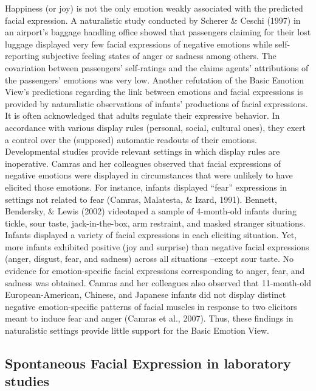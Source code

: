 \documentclass[man]{apa6}
\begin{document}
Happiness (or joy) is not the only emotion weakly associated with the predicted facial expression. A naturalistic study conducted by Scherer \& Ceschi (1997) in an airport's baggage handling office showed that passengers claiming for their lost luggage displayed very few facial expressions of negative emotions while self-reporting subjective feeling states of anger or sadness among others. The covariation between passengers' self-ratings and the claims agents' attributions of the passengers' emotions was very low. Another refutation of the Basic Emotion View's predictions regarding the link between emotions and facial expressions is provided by naturalistic observations of infants' productions of facial expressions. It is often acknowledged that adults regulate their expressive behavior. In accordance with various display rules (personal, social, cultural ones), they exert a control over the (supposed) automatic readouts of their emotions. Developmental studies provide relevant settings in which display rules are inoperative. Camras and her colleagues observed that facial expressions of negative emotions were displayed in circumstances that were unlikely to have elicited those emotions. For instance, infants displayed \enquote{fear} expressions in settings not related to fear (Camras, Malatesta, \& Izard, 1991). Bennett, Bendersky, \& Lewis (2002) videotaped a sample of 4-month-old infants during tickle, sour taste, jack-in-the-box, arm restraint, and masked stranger situations. Infants displayed a variety of facial expressions in each eliciting situation. Yet, more infants exhibited positive (joy and surprise) than negative facial expressions (anger, disgust, fear, and sadness) across all situations --except sour taste. No evidence for emotion-specific facial expressions corresponding to anger, fear, and sadness was obtained. Camras and her colleagues also observed that 11-month-old European-American, Chinese, and Japanese infants did not display distinct negative emotion-specific patterns of facial muscles in response to two elicitors meant to induce fear and anger (Camras et al., 2007). Thus, these findings in naturalistic settings provide little support for the Basic Emotion View.

\hypertarget{spontaneous-facial-expression-in-laboratory-studies}{%
\subsection{Spontaneous Facial Expression in laboratory studies}\label{spontaneous-facial-expression-in-laboratory-studies}}
\end{document}
